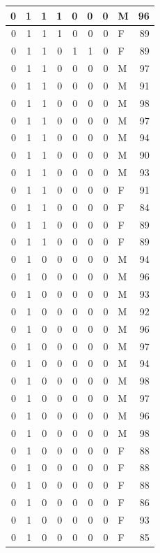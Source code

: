 \documentclass[
  12pt,
]{krantz}
\begin{document}
\begin{tabular}{r|r|r|r|r|r|r|l|r}
\hline
0 & 1 & 1 & 1 & 0 & 0 & 0 & M & 96\\
\hline
0 & 1 & 1 & 1 & 0 & 0 & 0 & F & 89\\
\hline
0 & 1 & 1 & 0 & 1 & 1 & 0 & F & 89\\
\hline
0 & 1 & 1 & 0 & 0 & 0 & 0 & M & 97\\
\hline
0 & 1 & 1 & 0 & 0 & 0 & 0 & M & 91\\
\hline
0 & 1 & 1 & 0 & 0 & 0 & 0 & M & 98\\
\hline
0 & 1 & 1 & 0 & 0 & 0 & 0 & M & 97\\
\hline
0 & 1 & 1 & 0 & 0 & 0 & 0 & M & 94\\
\hline
0 & 1 & 1 & 0 & 0 & 0 & 0 & M & 90\\
\hline
0 & 1 & 1 & 0 & 0 & 0 & 0 & M & 93\\
\hline
0 & 1 & 1 & 0 & 0 & 0 & 0 & F & 91\\
\hline
0 & 1 & 1 & 0 & 0 & 0 & 0 & F & 84\\
\hline
0 & 1 & 1 & 0 & 0 & 0 & 0 & F & 89\\
\hline
0 & 1 & 1 & 0 & 0 & 0 & 0 & F & 89\\
\hline
0 & 1 & 0 & 0 & 0 & 0 & 0 & M & 94\\
\hline
0 & 1 & 0 & 0 & 0 & 0 & 0 & M & 96\\
\hline
0 & 1 & 0 & 0 & 0 & 0 & 0 & M & 93\\
\hline
0 & 1 & 0 & 0 & 0 & 0 & 0 & M & 92\\
\hline
0 & 1 & 0 & 0 & 0 & 0 & 0 & M & 96\\
\hline
0 & 1 & 0 & 0 & 0 & 0 & 0 & M & 97\\
\hline
0 & 1 & 0 & 0 & 0 & 0 & 0 & M & 94\\
\hline
0 & 1 & 0 & 0 & 0 & 0 & 0 & M & 98\\
\hline
0 & 1 & 0 & 0 & 0 & 0 & 0 & M & 97\\
\hline
0 & 1 & 0 & 0 & 0 & 0 & 0 & M & 96\\
\hline
0 & 1 & 0 & 0 & 0 & 0 & 0 & M & 98\\
\hline
0 & 1 & 0 & 0 & 0 & 0 & 0 & F & 88\\
\hline
0 & 1 & 0 & 0 & 0 & 0 & 0 & F & 88\\
\hline
0 & 1 & 0 & 0 & 0 & 0 & 0 & F & 88\\
\hline
0 & 1 & 0 & 0 & 0 & 0 & 0 & F & 86\\
\hline
0 & 1 & 0 & 0 & 0 & 0 & 0 & F & 93\\
\hline
0 & 1 & 0 & 0 & 0 & 0 & 0 & F & 85\\

\end{tabular}
\end{document}
